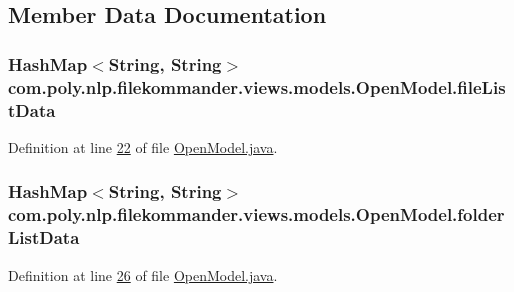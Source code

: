 \subsection{Member Data Documentation}
\hypertarget{classcom_1_1poly_1_1nlp_1_1filekommander_1_1views_1_1models_1_1_open_model_a1d7cf2afcf4a96977f34712a356662c6}{
\subsubsection[{file\-List\-Data}]{\setlength{\rightskip}{0pt plus 5cm}Hash\-Map$<$String, String$>$ com.\-poly.\-nlp.\-filekommander.\-views.\-models.\-Open\-Model.\-file\-List\-Data\hspace{0.3cm}{\ttfamily [private]}}}\label{classcom_1_1poly_1_1nlp_1_1filekommander_1_1views_1_1models_1_1_open_model_a1d7cf2afcf4a96977f34712a356662c6}


Definition at line \hyperlink{L22}{22} of file \hyperlink{}{Open\-Model.\-java}.

\hypertarget{classcom_1_1poly_1_1nlp_1_1filekommander_1_1views_1_1models_1_1_open_model_a57caf879510112ad16fbe357014d38e8}{
\subsubsection[{folder\-List\-Data}]{\setlength{\rightskip}{0pt plus 5cm}Hash\-Map$<$String, String$>$ com.\-poly.\-nlp.\-filekommander.\-views.\-models.\-Open\-Model.\-folder\-List\-Data\hspace{0.3cm}{\ttfamily [private]}}}\label{classcom_1_1poly_1_1nlp_1_1filekommander_1_1views_1_1models_1_1_open_model_a57caf879510112ad16fbe357014d38e8}


Definition at line \hyperlink{L26}{26} of file \hyperlink{}{Open\-Model.\-java}.

